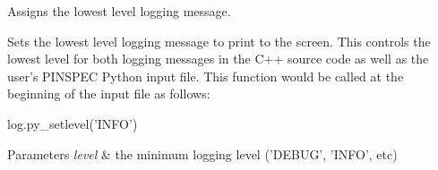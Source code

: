 Assigns the lowest level logging message. 

Sets the lowest level logging message to print to the screen. This controls the lowest level for both logging messages in the C++ source code as well as the user's P\-I\-N\-S\-P\-E\-C Python input file. This function would be called at the beginning of the input file as follows\-:


\begin{DoxyCode}
log.py\_setlevel(\textcolor{stringliteral}{'INFO'})
\end{DoxyCode}



\begin{DoxyParams}{Parameters}
{\em level} & the minimum logging level ('D\-E\-B\-U\-G', 'I\-N\-F\-O', etc) \\
\hline
\end{DoxyParams}
